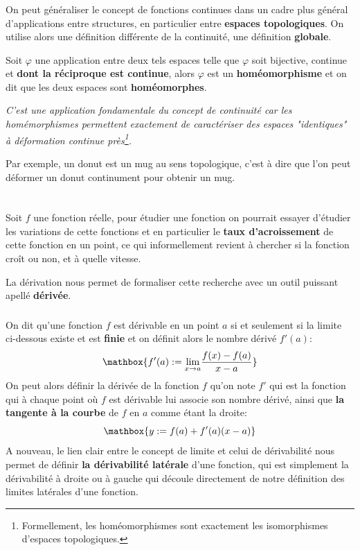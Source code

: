 \subsection*{}
On peut généraliser le concept de fonctions continues dans un cadre plus général d'applications entre structures, en particulier entre \textbf{espaces topologiques}. On utilise alors une définition différente de la continuité, une définition \textbf{globale}.\<

Soit \(\varphi\) une application entre deux tels espaces telle que \(\varphi\) soit bijective, continue et \textbf{dont la réciproque est continue}, alors \(\varphi\) est un \textbf{homéomorphisme} et on dit que les deux espaces sont \textbf{homéomorphes}.
\begin{center}
   \textit{
      C'est une application fondamentale du concept de continuité car les homémorphismes permettent exactement de caractériser des espaces "identiques" à déformation continue près\footnote[2]{Formellement, les homéomorphismes sont exactement les isomorphismes d'espaces topologiques.}.
   }
\end{center}
Par exemple, un donut est un mug au sens topologique, c'est à dire que l'on peut déformer un donut continument pour obtenir un mug.

\chapter*{}
Soit \(f\) une fonction réelle, pour étudier une fonction on pourrait essayer d'étudier les variations de cette fonctions et en particulier le \textbf{taux d'acroissement} de cette fonction en un point, ce qui informellement revient à chercher si la fonction croît ou non, et à quelle vitesse.\<

La dérivation nous permet de formaliser cette recherche avec un outil puissant apellé \textbf{dérivée}.

\subsection*{}
On dit qu'une fonction \(f\) est dérivable en un point \(a\) si et seulement si la limite ci-dessous existe et est \textbf{finie} et on définit alors le nombre dérivé \(f'(a)\):
\[
   \mathbox{f'(a) := \underset{x \rightarrow a}{\lim} \frac{f(x) - f(a)}{x - a}}   
\]
On peut alors définir la dérivée de la fonction \(f\) qu'on note \(f'\)  qui est la fonction qui à chaque point où \(f\) est dérivable lui associe son nombre dérivé, ainsi que \textbf{la tangente à la courbe} de \(f\) en \(a\) comme étant la droite:
\[
   \mathbox{y := f(a) + f'(a)(x - a)}   
\]
A nouveau, le lien clair entre le concept de limite et celui de dérivabilité nous permet de définir \textbf{la dérivabilité latérale} d'une fonction, qui est simplement la dérivabilité à droite ou à gauche qui découle directement de notre définition des limites latérales d'une fonction.\<

